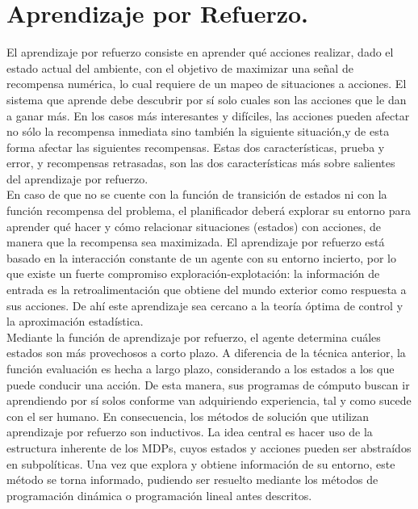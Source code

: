 \section{Aprendizaje por Refuerzo.}
El aprendizaje por refuerzo consiste en aprender qué acciones realizar, dado el estado actual del ambiente, con el objetivo de maximizar una se\~{n}al de recompensa numérica, lo cual requiere de un mapeo de situaciones a acciones. El sistema que aprende debe descubrir por sí solo cuales son las acciones que le dan a ganar más. En los casos más interesantes y difíciles, las acciones pueden afectar no sólo la recompensa inmediata sino también la siguiente situación,y de esta forma afectar las siguientes recompensas. Estas dos características, prueba y error, y recompensas retrasadas, son las dos características más sobre salientes del aprendizaje por refuerzo.\\

En caso de que no se cuente con la función de transición de estados ni con la función recompensa del problema, el planificador deberá explorar su entorno para aprender qué hacer y cómo relacionar situaciones (estados) con acciones, de manera que la recompensa sea maximizada. El aprendizaje por refuerzo está basado en la interacción constante de un agente con su entorno incierto, por lo que existe un fuerte compromiso exploración-explotación: la información de entrada es la retroalimentación que obtiene del mundo exterior como respuesta a sus acciones. De ahí este aprendizaje sea cercano a la teoría óptima de control y la aproximación estadística.\\

Mediante la función de aprendizaje por refuerzo, el agente determina cuáles estados son más provechosos a corto plazo. A diferencia de la técnica anterior, la función evaluación es hecha a largo plazo, considerando a los estados a los que puede conducir una acción. De esta manera, sus programas de cómputo buscan ir aprendiendo por sí solos conforme van adquiriendo experiencia, tal y como sucede con el ser humano. En consecuencia, los métodos de solución que utilizan aprendizaje por refuerzo son inductivos. La idea central es hacer uso de la estructura inherente de los MDPs, cuyos estados y acciones pueden ser abstraídos en subpolíticas. Una vez que explora y obtiene información de su entorno, este método se torna informado, pudiendo ser resuelto mediante los métodos de programación dinámica o programación lineal antes descritos.\\

